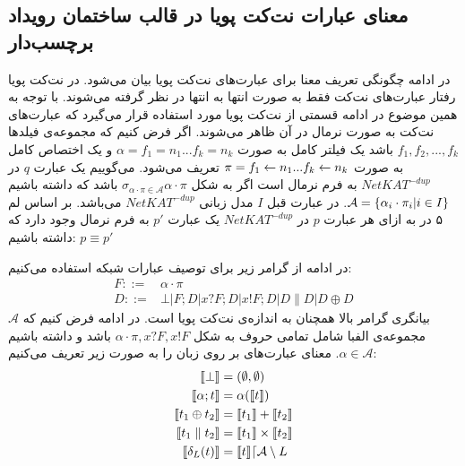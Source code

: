 \subsection{معنای عبارات نت‌کت پویا در قالب ساختمان رویداد برچسب‌دار}

در ادامه چگونگی تعریف معنا
برای عبارت‌های نت‌کت پویا بیان می‌شود.
در نت‌کت پویا رفتار عبارت‌های نت‌کت فقط به صورت انتها به انتها در نظر گرفته می‌شوند.
با توجه به همین موضوع در ادامه قسمتی از نت‌کت پویا مورد استفاده قرار می‌گیرد که عبارت‌های نت‌کت به صورت نرمال در آن ظاهر می‌شوند.
اگر فرض کنیم که مجموعه‌ی فیلد‌ها
$f_1,f_2,...,f_k$
باشد یک فیلتر کامل
به صورت
$\alpha = f_1 = n_1 ... f_k = n_k$
و یک اختصاص کامل
به صورت
$\pi = f_1 \leftarrow n_1 ... f_k \leftarrow n_k$
تعریف می‌شود.
می‌گوییم یک عبارت
$q$
در
$NetKAT^{-dup}$
به فرم نرمال است
اگر به شکل
$\sigma_{\alpha\cdot\pi \in \mathcal{A}}\alpha\cdot\pi$
باشد که داشته باشیم
$\mathcal{A} = \{\alpha_i\cdot\pi_i | i \in I\}$.
در عبارت قبل
$I$
مدل زبانی
$NetKAT^{-dup}$
می‌باشد.
بر اساس لم ۵ در
\cite{dynetkat}
به ازای هر عبارت
$p$
در
$NetKAT^{-dup}$
یک عبارت
$p'$
به فرم نرمال وجود دارد که داشته باشیم:
$p\equiv p'$

در ادامه از گرامر زیر برای توصیف عبارات شبکه استفاده می‌کنیم:
\begin{align*}
    F ::= & \alpha\cdot\pi                                          \\
    D ::= & \bot | F;D | x?F;D | x!F;D | D \parallel D | D \oplus D
\end{align*}
بیانگری
گرامر بالا همچنان به اندازه‌ی نت‌کت پویا است.
در ادامه فرض کنیم که
$\mathcal{A}$
مجموعه‌ی الفبا شامل تمامی حروف به شکل
$\alpha\cdot\pi,x?F,x!F$
باشد و داشته باشیم
$\alpha \in \mathcal{A}$.
معنای عبارت‌های بر روی زبان را به صورت زیر تعریف می‌کنیم:
\begin{align*}
    \llbracket \bot \rrbracket              & = (\emptyset,\emptyset)                               \\
    \llbracket \alpha;t \rrbracket          & = \alpha(\llbracket t \rrbracket)                       \\
    \llbracket t_1 \oplus t_2 \rrbracket    & = \llbracket t_1 \rrbracket + \llbracket t_2 \rrbracket                 \\
    \llbracket t_1 \parallel t_2 \rrbracket & = \llbracket t_1 \rrbracket \times \llbracket t_2 \rrbracket            \\
    \llbracket \delta_{L}(t) \rrbracket     & = \llbracket t \rrbracket\lceil \mathcal{A} \setminus L
\end{align*}